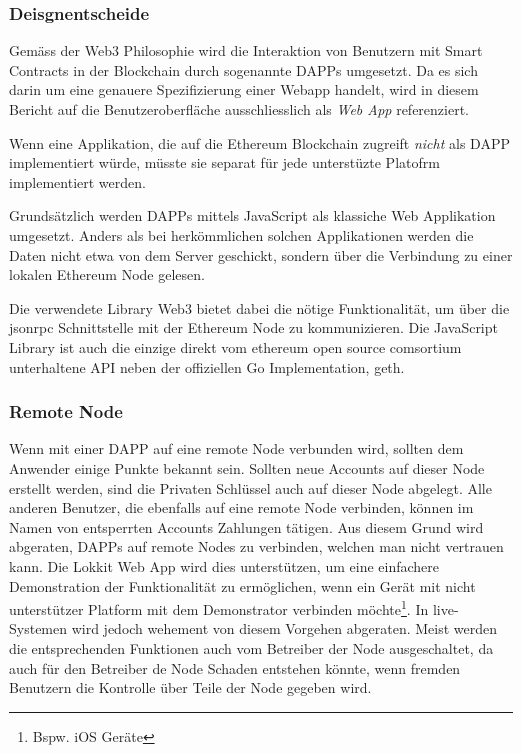 \subsubsection{Deisgnentscheide}
Gemäss der Web3 Philosophie wird die Interaktion von Benutzern mit Smart Contracts in der Blockchain durch sogenannte \acrshort{DAPPs} umgesetzt. Da es sich darin um eine genauere Spezifizierung einer Webapp handelt, wird in diesem Bericht auf die Benutzeroberfläche ausschliesslich als \emph{Web App} referenziert.\cite[Wiki/DAPP-Developer-Resources, Wiki/Useful-Dapp-Patterns]{github.com/ethereum}\cite{github.com/ethereum/web3js,web3js.readthedocs.io}

Wenn eine Applikation, die auf die Ethereum Blockchain zugreift \emph{nicht} als \acrshort{DAPP} implementiert würde, müsste sie separat für jede unterstüzte Platofrm implementiert werden.

Grundsätzlich werden \acrshort{DAPPs} mittels JavaScript als klassiche Web Applikation umgesetzt. Anders als bei herkömmlichen solchen Applikationen werden die Daten nicht etwa von dem Server geschickt, sondern über die Verbindung zu einer lokalen Ethereum Node gelesen.\cite[Wiki/DAPP-Developer-Resources, Wiki/Useful-Dapp-Patterns]{github.com/ethereum}

Die verwendete Library Web3 bietet dabei die nötige Funktionalität, um über die jsonrpc Schnittstelle mit der Ethereum Node zu kommunizieren. Die JavaScript Library ist auch die einzige direkt vom ethereum open source comsortium unterhaltene API neben der offiziellen Go Implementation, geth.\cite{github.com/ethereum/web3js}


\subsubsection{Remote Node}
\label{subsubsec:Remote_Node}
Wenn mit einer \acrshort{DAPP} auf eine remote Node verbunden wird, sollten dem Anwender einige Punkte bekannt sein. Sollten neue Accounts auf dieser Node erstellt werden, sind die Privaten Schlüssel auch auf dieser Node abgelegt. Alle anderen Benutzer, die ebenfalls auf eine remote Node verbinden, können im Namen von entsperrten Accounts Zahlungen tätigen. Aus diesem Grund wird abgeraten, \acrshort{DAPPs} auf remote Nodes zu verbinden, welchen man nicht vertrauen kann. Die Lokkit Web App wird dies unterstützen, um eine einfachere Demonstration der Funktionalität zu ermöglichen, wenn ein Gerät mit nicht unterstützer Platform mit dem Demonstrator verbinden möchte\footnote{Bspw. iOS Geräte}. In live-Systemen wird jedoch wehement von diesem Vorgehen abgeraten. Meist werden die entsprechenden Funktionen auch vom Betreiber der Node ausgeschaltet, da auch für den Betreiber de Node Schaden entstehen könnte, wenn fremden Benutzern die Kontrolle über Teile der Node gegeben wird.\cite[Wiki/DAPP-Developer-Resources, Wiki/Useful-Dapp-Patterns]{github.com/ethereum}

